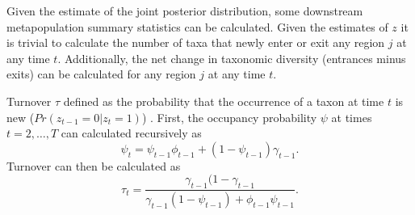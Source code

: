 \documentclass[12pt,letterpaper]{article}
\begin{document}

Given the estimate of the joint posterior distribution, some downstream metapopulation summary statistics can be calculated. Given the estimates of \(z\) it is trivial to calculate the number of taxa that newly enter or exit any region \(j\) at any time \(t\). Additionally, the net change in taxonomic diversity (entrances minus exits) can be calculated for any region \(j\) at any time \(t\).

Turnover \(\tau\) defined as the probability that the occurrence of a taxon at time \(t\) is new (\(Pr(z_{t - 1} = 0 | z_{t} = 1)\)) \citep{Royle2008}. First, the occupancy probability \(\psi\) at times \(t = 2, \dots, T\) can calculated recursively as
\begin{equation}
  \psi_{t} = \psi_{t - 1}\phi_{t - 1} + (1 - \psi_{t - 1})\gamma_{t - 1}.
\end{equation}
Turnover can then be calculated as
\begin{equation}
  \tau_{t} = \frac{\gamma_{t - 1} (1 - \gamma_{t - 1}}{\gamma_{t - 1} (1 - \psi_{t - 1}) + \phi_{t - 1} \psi_{t - 1}}.
\end{equation}
\end{document}
